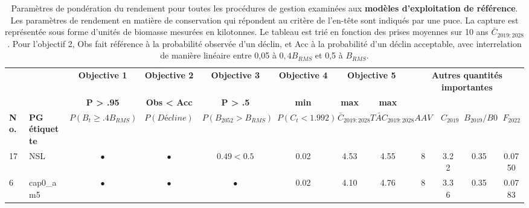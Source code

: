 \documentclass[11pt]{book}
\begin{document}
\newpage
\begin{turn}


\begingroup\fontsize{7}{9}\selectfont
\begingroup\fontsize{7}{9}\selectfont
\begin{longtable}[t]{llcccccccccc}
\caption{\label{tab:unnamed-chunk-7}Paramètres de pondération du rendement pour toutes les procédures de gestion examinées aux \textbf{modèles d’exploitation de référence}. Les paramètres de rendement en matière de conservation qui répondent au critère de l’en-tête sont indiqués par une puce. La capture est représentée sous forme d’unités de biomasse mesurées en kilotonnes. Le tableau est trié en fonction des prises moyennes sur 10 ans $\bar{C}_{2019:2028}$. Pour l’objectif 2, Obs fait référence à la probabilité observée d’un déclin, et Acc à la probabilité d’un déclin acceptable, avec interrelation de manière linéaire entre 0,05 à $0,4B_{RMS}$ et 0,5 à $B_{RMS}$.}\\
\toprule
\multicolumn{2}{c}{\textbf{ }} & \multicolumn{1}{c}{\textbf{Objective 1}} & \multicolumn{1}{c}{\textbf{Objective 2}} & \multicolumn{1}{c}{\textbf{Objective 3}} & \multicolumn{1}{c}{\textbf{Objective 4}} & \multicolumn{2}{c}{\textbf{Objective 5}} & \multicolumn{4}{c}{\textbf{Autres quantités importantes}} \\
\cmidrule(l{3pt}r{3pt}){3-3} \cmidrule(l{3pt}r{3pt}){4-4} \cmidrule(l{3pt}r{3pt}){5-5} \cmidrule(l{3pt}r{3pt}){6-6} \cmidrule(l{3pt}r{3pt}){7-8} \cmidrule(l{3pt}r{3pt}){9-12}
\multicolumn{2}{c}{\textbf{ }} & \multicolumn{1}{c}{\textbf{P > .95}} & \multicolumn{1}{c}{\textbf{Obs < Acc}} & \multicolumn{1}{c}{\textbf{P > .5}} & \multicolumn{1}{c}{\textbf{min}} & \multicolumn{1}{c}{\textbf{max}} & \multicolumn{1}{c}{\textbf{max}} & \multicolumn{4}{c}{\textbf{ }} \\
\cmidrule(l{3pt}r{3pt}){3-3} \cmidrule(l{3pt}r{3pt}){4-4} \cmidrule(l{3pt}r{3pt}){5-5} \cmidrule(l{3pt}r{3pt}){6-6} \cmidrule(l{3pt}r{3pt}){7-7} \cmidrule(l{3pt}r{3pt}){8-8}
\textbf{No.} & \textbf{PG étiquette} & \textbf{$P(B_t \geq .4B_{RMS})$} & \textbf{$P(Décline)$} & \textbf{$P(B_{2052} > B_{RMS})$} & \textbf{$P(C_t < 1.992)$} & \textbf{$\bar{C}_{2019:2028}$} & \textbf{$\bar{TAC}_{2019:2028}$} & \textbf{$AAV$} & \textbf{$C_{2019}$} & \textbf{$B_{2019}/B0$} & \textbf{$F_{2022}$}\\
\midrule
17 & NSL & $\bullet$ & $\bullet$ & $0.49<0.5$ & 0.02 & 4.53 & 4.55 & 8 & 3.22 & 0.35 & 0.0750\\
6 & cap0\_am5 & $\bullet$ & $\bullet$ & $\bullet$ & 0.02 & 4.10 & 4.76 & 8 & 3.36 & 0.35 & 0.0783\\

\end{longtable}
\end{turn}
\end{document}
